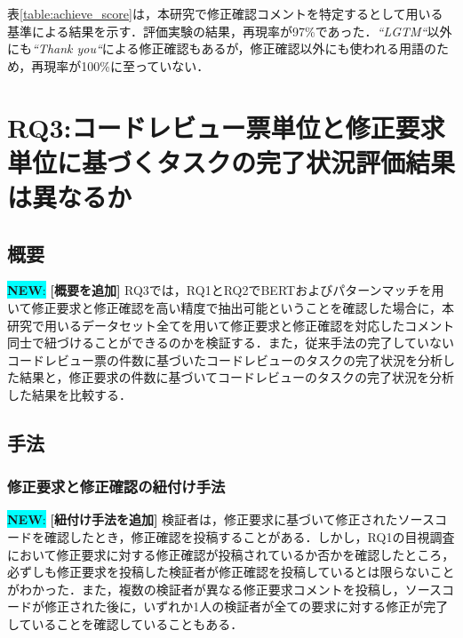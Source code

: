 \documentclass[11pt]{jreport}
\newcommand{\RQThree}{コードレビュー票単位と修正要求単位に基づくタスクの完了状況評価結果は異なるか}
\newcommand{\todo}[1]{\colorbox{yellow}{{\bf TODO}:}{\color{red} {\textbf{[#1]}}}}
\newcommand{\new}[1]{\colorbox{cyan}{{\bf NEW}:}{\color{black} {\textbf{[#1]}}}}
\begin{document}
表\ref{table:achieve_score}は，本研究で修正確認コメントを特定するとして用いる基準による結果を示す．評価実験の結果，再現率が97\%であった．\textit{``LGTM``}以外にも\textit{``Thank you``}による修正確認もあるが，修正確認以外にも使われる用語のため，再現率が100\%に至っていない．


\begin{table}[t]
\centering
  \caption{修正確認コメントの予測精度}
  \label{table:achieve_score}
\end{table}

\chapter{RQ3:\RQThree}\label{chap:RQ3}

\section{概要}
\new{概要を追加}
RQ3では，RQ1とRQ2でBERTおよびパターンマッチを用いて修正要求と修正確認を高い精度で抽出可能ということを確認した場合に，本研究で用いるデータセット全てを用いて修正要求と修正確認を対応したコメント同士で紐づけることができるのかを検証する．また，従来手法の完了していないコードレビュー票の件数に基づいたコードレビューのタスクの完了状況を分析した結果と，修正要求の件数に基づいてコードレビューのタスクの完了状況を分析した結果を比較する．

\section{手法}
\subsection{修正要求と修正確認の紐付け手法}
\new{紐付け手法を追加}
検証者は，修正要求に基づいて修正されたソースコードを確認したとき，修正確認を投稿することがある．しかし，RQ1の目視調査において修正要求に対する修正確認が投稿されているか否かを確認したところ，必ずしも修正要求を投稿した検証者が修正確認を投稿しているとは限らないことがわかった．また，複数の検証者が異なる修正要求コメントを投稿し，ソースコードが修正された後に，いずれか1人の検証者が全ての要求に対する修正が完了していることを確認していることもある．
\end{document}
